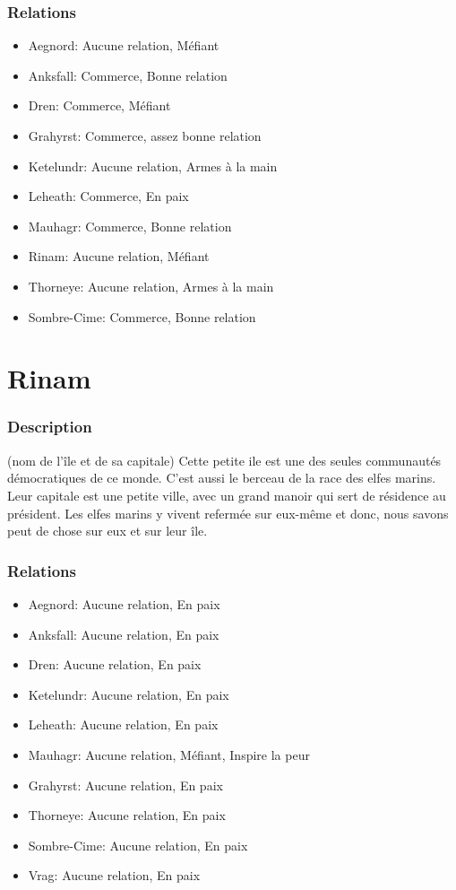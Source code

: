 \subsubsection{Relations}
\begin{itemize}
\item Aegnord: Aucune relation, Méfiant  
\item Anksfall: Commerce, Bonne relation 
\item Dren: Commerce, Méfiant  
\item Grahyrst: Commerce, assez bonne relation   
\item Ketelundr: Aucune relation, Armes à la main
\item Leheath: Commerce, En paix 
\item Mauhagr: Commerce, Bonne relation  
\item Rinam: Aucune relation, Méfiant
\item Thorneye: Aucune relation, Armes à la main 
\item Sombre-Cime: Commerce, Bonne relation 
\end{itemize}
\section{Rinam}
\subsubsection{Description}
\hypertarget{rinam}{}(nom de l’île et de sa capitale) Cette petite ile est une des seules communautés démocratiques de ce monde.
C'est aussi le berceau de la race des elfes marins.
Leur capitale est une petite ville, avec un grand manoir qui sert de résidence au président.
Les elfes marins y vivent refermée sur eux-même et donc, nous savons peut de chose sur eux et sur leur île.
\subsubsection{Relations} 
\begin{itemize}
\item Aegnord: Aucune relation, En paix   
\item Anksfall: Aucune relation, En paix 
\item Dren: Aucune relation, En paix 
\item Ketelundr: Aucune relation, En paix 
\item Leheath: Aucune relation, En paix 
\item Mauhagr: Aucune relation, Méfiant, Inspire la peur   
\item Grahyrst: Aucune relation, En paix 
\item Thorneye: Aucune relation, En paix  
\item Sombre-Cime: Aucune relation, En paix 
\item Vrag: Aucune relation, En paix 
\end{itemize}
